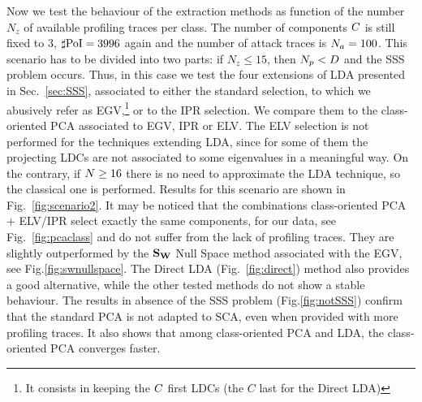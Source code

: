 Now we test the behaviour of the extraction methods as function of the number $N_z$ of available profiling traces per class. The number of components $C$ is still fixed to 3, $\sharp\mathrm{PoI}=3996$ again and the number of attack traces is $N_a=100$. This scenario has to be divided into two parts: if $N_z\leq 15$, then $N_p<D$ and the SSS problem occurs. Thus, in this case we test the four extensions of LDA presented in Sec.~\ref{sec:SSS}, associated to either the standard selection, to which we abusively refer as EGV,\footnote{It consists in keeping the $C$ first LDCs (the $C$ last for the Direct LDA)}
or to the IPR selection.  We compare them to the class-oriented PCA associated to EGV, IPR or ELV. The ELV selection is not performed for the techniques extending LDA, since for some of them the projecting LDCs are not associated to some eigenvalues in a meaningful way. On the contrary, if $N \geq 16$ there is no need to approximate the LDA technique, so the classical one is performed. Results for this scenario are shown in Fig.~\ref{fig:scenario2}. It may be noticed that the combinations class-oriented PCA + ELV/IPR select exactly the same components, for our data, see Fig.~\ref{fig:pcaclass} and do not suffer from the lack of profiling traces. They are slightly outperformed by the $\textbf{S}_{\textbf{W}}$ Null Space method associated with the EGV, see Fig.\ref{fig:swnullspace}. The Direct LDA (Fig.~\ref{fig:direct}) method also provides a good alternative, while the other tested methods do not show a stable behaviour. The results in absence of the SSS problem (Fig.\ref{fig:notSSS}) confirm that the standard PCA is not adapted to SCA, even when provided with more profiling traces. It also shows that among class-oriented PCA and LDA, the class-oriented PCA converges faster.




